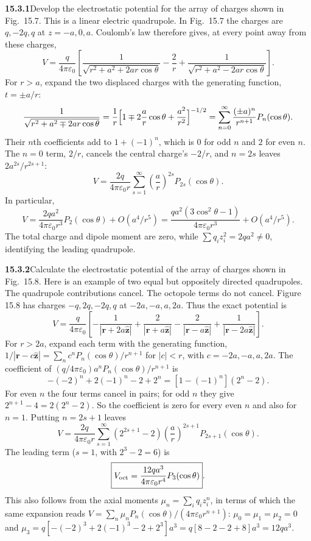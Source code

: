 \par\bigskip
\noindent\textbf{15.3.1}\quad Develop the electrostatic potential for
the array of charges shown in Fig.~15.7. This is a linear electric
quadrupole.
\solution
In Fig.~15.7 the charges are $q,-2q,q$ at $z=-a,0,a$.
Coulomb's law therefore gives, at every point away from these charges,
\[
V=\frac{q}{4\pi\varepsilon_0}
\left[\frac1{\sqrt{r^2+a^2+2ar\cos\theta}}-\frac2r
+\frac1{\sqrt{r^2+a^2-2ar\cos\theta}}\right].
\]
For $r>a$, expand the two displaced charges with the generating
function, $t=\pm a/r$:
\[
\frac1{\sqrt{r^2+a^2\mp2ar\cos\theta}}
=\frac1r\Bigl[1\mp2\frac ar\cos\theta+\frac{a^2}{r^2}\Bigr]^{-1/2}
=\sum_{n=0}^\infty\frac{(\pm a)^n}{r^{n+1}}P_n(\cos\theta).
\]
Their $n$th coefficients add to $1+(-1)^n$, which is $0$ for odd $n$
and $2$ for even $n$. The $n=0$ term, $2/r$, cancels the central
charge's $-2/r$, and $n=2s$ leaves $2a^{2s}/r^{2s+1}$:
\[
\boxed{V=\frac{2q}{4\pi\varepsilon_0r}
\sum_{s=1}^\infty\left(\frac ar\right)^{2s}P_{2s}(\cos\theta)}.
\]
In particular,
\[
V=\frac{2qa^2}{4\pi\varepsilon_0r^3}P_2(\cos\theta)
+O(a^4/r^5)
=\frac{qa^2(3\cos^2\theta-1)}{4\pi\varepsilon_0r^3}
+O(a^4/r^5).
\]
The total charge and dipole moment are zero, while
$\sum q_i z_i^2=2qa^2\ne0$, identifying the leading quadrupole.

\par\bigskip
\noindent\textbf{15.3.2}\quad Calculate the electrostatic potential of
the array of charges shown in Fig.~15.8. Here is an example of two
equal but oppositely directed quadrupoles. The quadrupole
contributions cancel. The octopole terms do not cancel.
\solution
Figure 15.8 has charges $-q,2q,-2q,q$ at $-2a,-a,a,2a$.
Thus the exact potential is
\[
V=\frac{q}{4\pi\varepsilon_0}
\left[-\frac1{|\mathbf r+2a\hat{\mathbf z}|}
+\frac2{|\mathbf r+a\hat{\mathbf z}|}
-\frac2{|\mathbf r-a\hat{\mathbf z}|}
+\frac1{|\mathbf r-2a\hat{\mathbf z}|}\right].
\]
For $r>2a$, expand each term with the generating function,
$1/|\mathbf r-c\hat{\mathbf z}|=\sum_nc^nP_n(\cos\theta)/r^{n+1}$ for
$|c|<r$, with $c=-2a,-a,a,2a$. The coefficient of
$(q/4\pi\varepsilon_0)a^nP_n(\cos\theta)/r^{n+1}$ is
\[
-(-2)^n+2(-1)^n-2+2^n
=[1-(-1)^n](2^n-2).
\]
For even $n$ the four terms cancel in pairs; for odd $n$ they give
$2^{n+1}-4=2(2^n-2)$. So the coefficient is zero for every even $n$ and
also for $n=1$. Putting $n=2s+1$ leaves
\[
\boxed{V=\frac{2q}{4\pi\varepsilon_0r}
\sum_{s=1}^\infty(2^{2s+1}-2)
\left(\frac ar\right)^{2s+1}P_{2s+1}(\cos\theta)}.
\]
The leading term ($s=1$, with $2^3-2=6$) is
\[
\boxed{V_{\rm oct}=\frac{12qa^3}{4\pi\varepsilon_0r^4}
P_3(\cos\theta)}.
\]
This also follows from the axial moments $\mu_n=\sum_iq_iz_i^n$, in
terms of which the same expansion reads
$V=\sum_n\mu_nP_n(\cos\theta)/(4\pi\varepsilon_0r^{n+1})$:
$\mu_0=\mu_1=\mu_2=0$ and
$\mu_3=q[-(-2)^3+2(-1)^3-2+2^3]a^3=q[8-2-2+8]a^3=12qa^3$.

